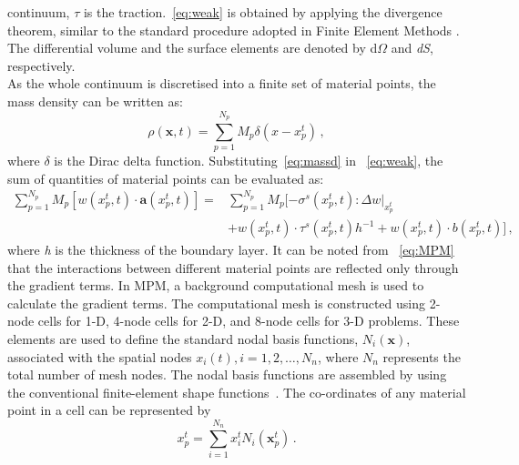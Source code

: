 continuum, $\tau$ is the traction.~\cref{eq:weak} is obtained by applying 
the divergence theorem, similar to the standard procedure adopted in Finite 
Element Methods \citep{Sulsky1994,Sulsky1995, Chen2002}. The differential 
volume and the surface elements are denoted by d$\Omega$ and \textit{dS}, 
respectively. \\
As the whole continuum is discretised into a finite set of material points, the 
mass density can be written as:
\begin{equation}
\rho(\mathbf{x},t)=\sum\limits_{\mathit{p}=1}^{\mathit{N}_{p}}
{\mathit{M}_{p}\delta(\mathbf{\mathit{x}}-\mathbf{\mathit{x}}_{p}^{t})} \,,
\label{eq:massd}
\end{equation}
where $\delta$ is the Dirac delta function. Substituting~\cref{eq:massd} in 
~\cref{eq:weak}, the sum of quantities of material points can be evaluated 
as:
\begin{align}
\nonumber
\sum\limits_{\mathit{p}=1}^{\mathit{N}_{p}} 
\mathit{M}_{p}[\mathbf{\mathit{w}}(\mathit{x}_{p}^{t},t) \cdot 
\mathbf{a}(\mathit{x}_{p}^{t},t)] = & 
\sum\limits_{\mathit{p}=1}^{\mathit{N}_{p}} \mathit{M}_{p} 
[-\sigma^{s}(\mathit{x}_{p}^{t},t): \Delta 
\mathbf{\mathit{w}}|_{\mathit{x}_{p}^{t}} \\ 
& + \mathbf{\mathit{w}}(\mathit{x}_{p}^{t},t) \cdot 
\tau^{s}(\mathit{x}_{p}^{t},t)h^{-1} +  
\mathbf{\mathit{w}}(\mathit{x}_{p}^{t},t) \cdot 
\mathbf{\mathit{b}}(\mathit{x}_{p}^{t},t)] \,,
\label{eq:MPM}
\end{align}
where \textit{h} is the thickness of the boundary layer. It can be noted from 
~\cref{eq:MPM} that the interactions between different material points are 
reflected only through the gradient terms. In MPM, a background computational 
mesh is used to calculate the gradient terms. The computational mesh is 
constructed using 2-node cells for 1-D, 4-node cells for 2-D, and 8-node cells 
for 3-D problems. These elements are used to define the standard nodal basis 
functions, $\mathit{N}_{i}(\mathbf{x})$, associated with the spatial nodes 
$\mathbf{\mathit{x}}_{i}(t), \mathit{i}=1,2,\dots,\mathit{N}_{n}$, where 
$\mathit{N}_{n}$ represents the total number of mesh nodes. The nodal basis 
functions are assembled by using the conventional finite-element shape 
functions~\citep{Chen2002}. The co-ordinates of any material point in a cell 
can be represented by
%
\begin{equation}
\mathbf{\mathit{x}}_{p}^{t} = \sum\limits_{\mathit{i}=1}^{\mathit{N}_{n}} 
\mathbf{\mathit{x}}_{\mathit{i}}^{t}\mathit{N}_{\mathit{i}}(\mathbf{x}_{p}^{t}) 
\,.
\label{eq:x}
\end{equation}
